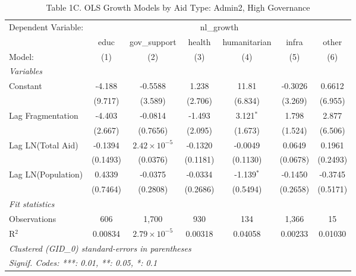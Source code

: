 \begin{table}[H]
   \caption{Table 1C. OLS Growth Models by Aid Type: Admin2, High Governance}
   \centering
   \begin{tabular}{lcccccc}
      \tabularnewline \midrule \midrule
      Dependent Variable: & \multicolumn{6}{c}{nl\_growth}\\
                         & educ     & gov\_support          & health   & humanitarian & infra    & other \\   
      Model:             & (1)      & (2)                   & (3)      & (4)          & (5)      & (6)\\  
      \midrule
      \emph{Variables}\\
      Constant           & -4.188   & -0.5588               & 1.238    & 11.81        & -0.3026  & 0.6612\\   
                         & (9.717)  & (3.589)               & (2.706)  & (6.834)      & (3.269)  & (6.955)\\   
      Lag Fragmentation  & -4.403   & -0.0814               & -1.493   & 3.121$^{*}$  & 1.798    & 2.877\\   
                         & (2.667)  & (0.7656)              & (2.095)  & (1.673)      & (1.524)  & (6.506)\\   
      Lag LN(Total Aid)  & -0.1394  & $2.42\times 10^{-5}$  & -0.1320  & -0.0049      & 0.0649   & 0.1961\\   
                         & (0.1493) & (0.0376)              & (0.1181) & (0.1130)     & (0.0678) & (0.2493)\\   
      Lag LN(Population) & 0.4339   & -0.0375               & -0.0334  & -1.139$^{*}$ & -0.1450  & -0.3745\\   
                         & (0.7464) & (0.2808)              & (0.2686) & (0.5494)     & (0.2658) & (0.5171)\\   
      \midrule
      \emph{Fit statistics}\\
      Observations       & 606      & 1,700                 & 930      & 134          & 1,366    & 15\\  
      R$^2$              & 0.00834  & $2.79\times 10^{-5}$  & 0.00318  & 0.04058      & 0.00233  & 0.01030\\  
      \midrule \midrule
      \multicolumn{7}{l}{\emph{Clustered (GID\_0) standard-errors in parentheses}}\\
      \multicolumn{7}{l}{\emph{Signif. Codes: ***: 0.01, **: 0.05, *: 0.1}}\\
   \end{tabular}
\end{table}



